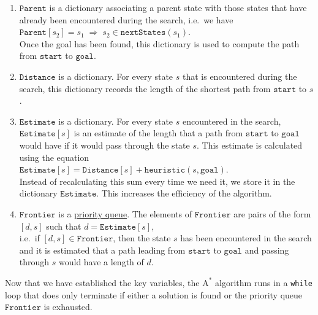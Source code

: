 \begin{enumerate}
\item $\mathtt{Parent}$ is a dictionary associating a parent state with those states that have already been
      encountered during the search, i.e.~we have
      \\[0.2cm]
      \hspace*{1.3cm}
      $\mathtt{Parent}[s_2] = s_1 \;\Rightarrow\; s_2 \in \mathtt{nextStates}(s_1)$.
      \\[0.2cm]
      Once the goal has been found, this dictionary is used to compute the path from $\mathtt{start}$ to
      $\mathtt{goal}$. 
\item $\mathtt{Distance}$ is a dictionary.  For every state $s$ that is encountered during the
      search,  this dictionary records the length of the shortest path from $\mathtt{start}$ to $s$.
\item $\mathtt{Estimate}$ is a dictionary.  For every state $s$ encountered in the search, $\mathtt{Estimate}[s]$
      is an estimate of the length that a path from $\mathtt{start}$ to $\mathtt{goal}$ would have if it would
      pass through the state $s$.  This estimate is calculated using the equation
      \\[0.2cm]
      \hspace*{1.3cm}
      $\mathtt{Estimate}[s] = \mathtt{Distance}[s] + \mathtt{heuristic}(s, \mathtt{goal})$.
      \\[0.2cm]
      Instead of recalculating this sum every time we need it, we store it in the dictionary
      $\mathtt{Estimate}$.  This increases the efficiency of the algorithm.
\item $\mathtt{Frontier}$ is a \href{https://en.wikipedia.org/wiki/Priority_queue}{priority queue}.
      The elements of $\mathtt{Frontier}$ are pairs of the form
      \\[0.2cm]
      \hspace*{1.3cm}
      $[d, s]$ \quad such that \quad $d = \mathtt{Estimate}[s]$,
      \\[0.2cm]
      i.e.~if $[d, s] \in \mathtt{Frontier}$, then the state $s$ has been encountered in the search and it is
      estimated that a path leading from $\mathtt{start}$ to $\mathtt{goal}$ and passing through $s$ would have
      a length of $d$.
\end{enumerate}
Now that we have established the key variables, the $\mathrm{A}^*$ algorithm runs in a \texttt{while} loop that
does only terminate if either a solution is found or the priority queue $\mathtt{Frontier}$ is exhausted.

